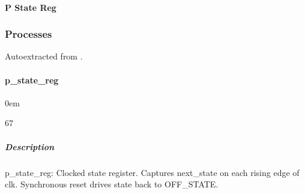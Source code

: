 \documentclass[letterpaper,10pt,english]{sphinxmanual}
\begin{document}
\paragraph{P State Reg}
\label{\detokenize{modules/blinky/timing:p-state-reg}}
\noindent{}

\sphinxstepscope


\subsubsection{Processes}
\label{\detokenize{modules/blinky/processes/index:processes}}\label{\detokenize{modules/blinky/processes/index::doc}}
\sphinxAtStartPar
Auto\sphinxhyphen{}extracted from .

\sphinxstepscope


\paragraph{p\_state\_reg}
\label{\detokenize{modules/blinky/processes/p_state_reg:p-state-reg}}\label{\detokenize{modules/blinky/processes/p_state_reg::doc}}
\begin{DUlineblock}{0em}
\item[]  
\item[]  67
\item[]  
\item[]  
\end{DUlineblock}


\subparagraph{Description}
\label{\detokenize{modules/blinky/processes/p_state_reg:description}}
\sphinxAtStartPar
p\_state\_reg: Clocked state register.
Captures next\_state on each rising edge of clk.
Synchronous reset drives state back to OFF\_STATE.

\noindent{}
\end{document}
